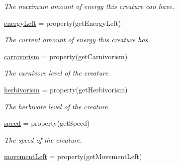 \begin{DoxyCompactItemize}
\begin{DoxyCompactList}\small\item\em \-The maximum amount of energy this creature can have. \end{DoxyCompactList}\item 
\hyperlink{classGameObject_1_1Creature_ace5b2a169011315af356ac45e836dce7}{energy\-Left} = property(get\-Energy\-Left)
\begin{DoxyCompactList}\small\item\em \-The current amount of energy this creature has. \end{DoxyCompactList}\item 
\hypertarget{classGameObject_1_1Creature_a4be27621006db34e37bb9dd71fc74f2d}{\hyperlink{classGameObject_1_1Creature_a4be27621006db34e37bb9dd71fc74f2d}{carnivorism} = property(get\-Carnivorism)}\label{classGameObject_1_1Creature_a4be27621006db34e37bb9dd71fc74f2d}

\begin{DoxyCompactList}\small\item\em \-The carnivore level of the creature. \end{DoxyCompactList}\item 
\hypertarget{classGameObject_1_1Creature_a7089d26c34e0f461e11a3e4b1e1a2521}{\hyperlink{classGameObject_1_1Creature_a7089d26c34e0f461e11a3e4b1e1a2521}{herbivorism} = property(get\-Herbivorism)}\label{classGameObject_1_1Creature_a7089d26c34e0f461e11a3e4b1e1a2521}

\begin{DoxyCompactList}\small\item\em \-The herbivore level of the creature. \end{DoxyCompactList}\item 
\hypertarget{classGameObject_1_1Creature_a7b60ef55234e65b5f52950fa88c7c4f7}{\hyperlink{classGameObject_1_1Creature_a7b60ef55234e65b5f52950fa88c7c4f7}{speed} = property(get\-Speed)}\label{classGameObject_1_1Creature_a7b60ef55234e65b5f52950fa88c7c4f7}

\begin{DoxyCompactList}\small\item\em \-The speed of the creature. \end{DoxyCompactList}\item 
\hypertarget{classGameObject_1_1Creature_aa3f52302e0297569dc7a7a14ea0531f5}{\hyperlink{classGameObject_1_1Creature_aa3f52302e0297569dc7a7a14ea0531f5}{movement\-Left} = property(get\-Movement\-Left)}\label{classGameObject_1_1Creature_aa3f52302e0297569dc7a7a14ea0531f5}


\end{DoxyCompactItemize}
